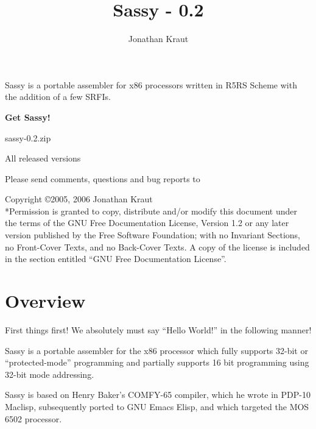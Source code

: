 \documentclass[11pt]{book}
\def\chapterl#1{
\chapter{#1}
\label{#1}
\index{#1}
}
\begin{document}
\title{Sassy - 0.2}
\author{Jonathan Kraut}
\maketitle

\centerline{Sassy is a portable assembler for x86 processors written in R5RS Scheme with the addition of a few SRFIs.}

\centerline{{\bf Get Sassy!}}
\centerline{}
\centerline{ {sassy-0.2.zip}}

\centerline{ {All released versions}}

\centerline{Please send comments, questions and bug reports to}
\centerline{}

\pagebreak

Copyright \copyright 2005, 2006 Jonathan Kraut
\\*Permission is granted to copy, distribute and/or modify this document
under the terms of the GNU Free Documentation License, Version 1.2 or
any later version published by the Free Software Foundation; with no
Invariant Sections, no Front-Cover Texts, and no Back-Cover Texts.  A
copy of the license is included in the section entitled ``GNU Free
Documentation License''.

\tableofcontents


\chapterl{Overview}

First things first! We absolutely must say ``Hello World!'' in the
following manner!


Sassy is a portable assembler for the x86 processor which fully supports
32-bit or ``protected-mode'' programming and partially supports 16
bit programming using 32-bit mode addressing.

Sassy is based
on Henry Baker's COMFY-65 compiler, which he wrote in PDP-10
Maclisp, subsequently ported to GNU Emacs Elisp, and which targeted the
MOS 6502 processor.
\end{document}
